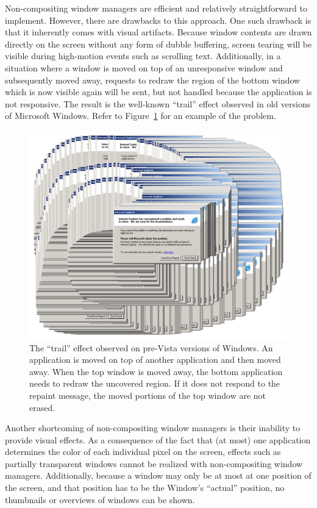 \documentclass[10pt,twocolumn,a4paper]{article}
\begin{document}
			Non-compositing window managers are efficient and relatively
			straightforward to implement. However, there are drawbacks
			to this approach.  One such drawback is that it inherently comes
			with visual artifacts. Because window contents are drawn
			directly on the screen without any form of dubble buffering, screen
			tearing will be visible during high-motion events such as scrolling
			text. Additionally, in a situation where a window is moved on top
			of an unresponsive window and subsequently moved away, requests to
			redraw the region of the bottom window which is now visible again
			will be sent, but not handled because the application is not
			responsive. The result is the well-known \enquote{trail} effect
			observed in old versions of Microsoft Windows. Refer to
			Figure~\ref{fig:trail} for an example of the problem.
			\begin{figure}[h]
				\centering
				\includegraphics[width=0.8\columnwidth]{trail}
				\caption{The \enquote{trail} effect observed on pre-Vista versions
					of Windows. An application is moved on top of another application
					and then moved away. When the top window is moved away, the bottom
					application needs to redraw the uncovered region. If it does not
					respond to the repaint message, the moved portions of the top
					window are not erased.}
				\label{fig:trail}
			\end{figure}

			Another shortcoming of non-compositing window managers is their
			inability to provide visual effects. As a consequence of the fact
			that (at most) one application determines the color of each individual
			pixel on the screen, effects such as partially transparent windows
			cannot be realized with non-compositing window managers. Additionally,
			because a window may only be at most at one position of the screen,
			and that position has to be the Window's \enquote{actual} position,
			no thumbnails or overviews of windows can be shown.
\end{document}
